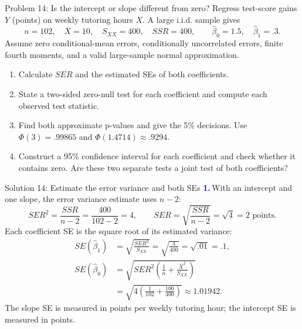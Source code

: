 \documentclass[notes,10pt, aspectratio=169]{beamer}
\newif\ifshowsolutions
\newcommand{\answerpart}[1]{\textcolor{blue}{\textbf{#1.}}\,}
\begin{document}
\begin{frame}{Problem 14: Is the intercept or slope different from zero?}
Regress test-score gains $Y$ (points) on weekly tutoring hours $X$. A large i.i.d. sample gives
\[
n=102,\quad\overline X=10,\quad S_{XX}=400,\quad SSR=400,
\qquad\widehat\beta_0=1.5,\quad\widehat\beta_1=.3.
\]
Assume zero conditional-mean errors, conditionally uncorrelated errors, finite fourth moments, and a valid large-sample normal approximation.
\begin{enumerate}
\setlength{\itemsep}{5pt}
\item Calculate $SER$ and the estimated SEs of both coefficients.
\item State a two-sided zero-null test for each coefficient and compute each observed test statistic.
\item Find both approximate p-values and give the 5\% decisions. Use $\Phi(3)=.99865$ and $\Phi(1.4714)\approx.9294$.
\item Construct a 95\% confidence interval for each coefficient and check whether it contains zero. Are these two separate tests a joint test of both coefficients?
\end{enumerate}
\end{frame}

\ifshowsolutions
\begin{frame}{Solution 14: Estimate the error variance and both SEs}
\small
\answerpart{1}With an intercept and one slope, the error variance estimate uses $n-2$:
\[
SER^2=\frac{SSR}{n-2}=\frac{400}{102-2}=4,
\qquad SER=\sqrt{\frac{SSR}{n-2}}=\sqrt4=\boxed2\text{ points}.
\]
Each coefficient SE is the square root of its estimated variance:
\begin{align*}
SE(\widehat\beta_1)
&=\sqrt{\frac{SER^2}{S_{XX}}}
=\sqrt{\frac4{400}}=\sqrt{.01}=\boxed{.1},\\[6pt]
SE(\widehat\beta_0)
&=\sqrt{SER^2\left(\frac1n+\frac{\overline X^2}{S_{XX}}\right)}\\
&=\sqrt{4\left(\frac1{102}+\frac{100}{400}\right)}
\approx\boxed{1.01942}.
\end{align*}
The slope SE is measured in points per weekly tutoring hour; the intercept SE is measured in points.
\end{frame}
\end{document}
